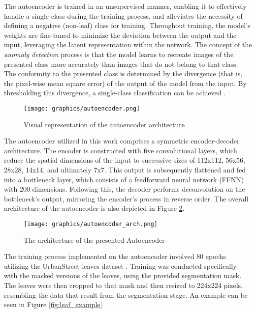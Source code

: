 \documentclass[draft,final]{vutinfth} %
\begin{document}
The autoencoder is trained in an unsupervised manner, enabling it to effectively handle a single class during the training process, and alleviates the necessity of defining a negative (non-leaf) class for training. Throughout training, the model's weights are fine-tuned to minimize the deviation between the output and the input, leveraging the latent representation within the network. 
The concept of the \textit{anomaly detection} process is that the model learns to recreate images of the presented class more accurately than images that do not belong to that class.
The conformity to the presented class is determined by the divergence (that is, the pixel-wise mean square error) of the output of the model from the input. By thresholding this divergence, a single-class classification can be achieved \cite{bank_autoencoders_2021}.

\begin{figure}
    \centering
    \texttt{[image: graphics/autoencoder.png]}
    \caption{Visual representation of the autoencoder architecture \cite{kumawat_everything_2023}}
    \label{fig:autoencoders}
\end{figure}

The autoencoder utilized in this work comprises a symmetric encoder-decoder architecture. The encoder is constructed with five convolutional layers, which reduce the spatial dimensions of the input to successive sizes of 112x112, 56x56, 28x28, 14x14, and ultimately 7x7. This output is subsequently flattened and fed into a bottleneck layer, which consists of a feedforward neural network (FFNN) with 200 dimensions. Following this, the decoder performs deconvolution on the bottleneck's output, mirroring the encoder's process in reverse order. The overall architecture of the autoencoder is also depicted in Figure \ref{fig:autoencoder_arch}.
\begin{figure}
    \centering
    \texttt{[image: graphics/autoencoder\_arch.png]}
    \caption{The architecture of the presented Autoencoder}
    \label{fig:autoencoder_arch}
\end{figure}

The training process implemented on the autoencoder involved 80 epochs utilizing the UrbanStreet leaves dataset \cite{yang_urban_2023}. Training was conducted specifically with the masked versions of the leaves, using the provided segmentation mask. The leaves were then cropped to that mask and then resized to 224x224 pixels, resembling the data that result from the segmentation stage. An example can be seen in Figure \ref{fig:leaf_example}
\end{document}
